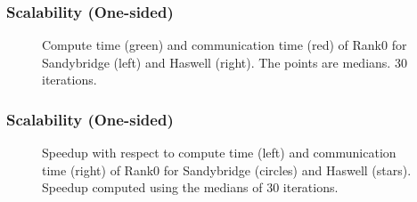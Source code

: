\documentclass[10pt, compress]{beamer}
\begin{document}
\begin{frame}
  \frametitle{Scalability (One-sided)}
  \begin{figure}
  \centering
  \caption{Compute time (green) and communication time (red) of Rank0 for Sandybridge (left) and Haswell (right). The points are medians. 30 iterations.}
  \label{fig:times_onesided}
  \end{figure}
\end{frame}

\begin{frame}
  \frametitle{Scalability (One-sided)}
  \begin{figure}
  \centering
  \caption{Speedup with respect to compute time (left) and communication time (right) of Rank0 for Sandybridge (circles) and Haswell (stars). Speedup computed using the medians of 30 iterations.}
  \label{fig:speedup_onesided}
  \end{figure}
\end{frame}
\end{document}
